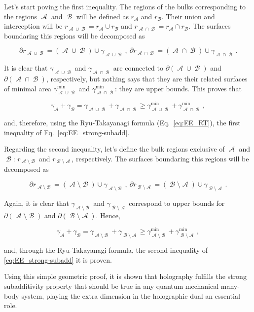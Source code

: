 \documentclass[twocolumn]{revtex4}
\providecommand{\eq}[2]{
    \begin{equation}
        #2
    \label{eq:#1}
    \end{equation}
}
\DeclareMathOperator{\calA}{\mathcal{A}}
\DeclareMathOperator{\calB}{\mathcal{B}}
\begin{document}
Let's start poving the first inequality. The regions of the bulks corresponding to the regions $\calA$ and $\calB$ will be defined as $r_{\calA}$ and $r_{\calB}$. Their union and interception will be $r_{\calA \cup \calB} = r_{\calA} \cup r_{\calB}$ and $r_{\calA \cap \calB} = r_{\calA} \cap r_{\calB}$. The surfaces boundaring this regions will be decomposed as
\eq{SS_dr-1}{
    \partial r_{\calA \cup \calB} = (\calA \cup \calB) \cup \gamma_{\calA \cup \calB} \ , \ \partial r_{\calA \cap \calB } = (\calA \cap \calB) \cup \gamma_{\calA \cap \calB} \ .
}
It is clear that $\gamma_{\calA \cup \calB}$ and $\gamma_{\calA \cap \calB}$ are connected to $\partial (\calA \cup \calB)$ and $\partial (\calA \cap \calB)$, respectively, but nothing says that they are their related surfaces of minimal area $\gamma^{\text{min}}_{\calA \cup \calB}$ and $\gamma^{\text{min}}_{\calA \cap \calB}$: they are upper bounds. This proves that
\eq{SS_gamma-1}{
    \gamma_{\calA} + \gamma_{\calB} = \gamma_{\calA \cup \calB} + \gamma_{\calA \cap \calB} \ge \gamma^{\text{min}}_{\calA \cup \calB} + \gamma^{\text{min}}_{\calA \cap \calB} \ ,
}
and, therefore, using the Ryu-Takayanagi formula (Eq.~\ref{eq:EE_RT}), the first inequality of Eq.~\ref{eq:EE_strong-subadd}.

Regarding the second inequality, let's define the bulk regions exclusive of $\calA$ and $\calB$: $r_{\calA \setminus \calB}$ and $r_{\calB \setminus \calA}$, respectively. The surfaces boundaring this regions will be decomposed as
\eq{SS_dr-2}{
    \partial r_{\calA \setminus \calB} = (\calA \setminus \calB) \cup \gamma_{\calA \setminus \calB} \ , \ \partial r_{\calB \setminus \calA } = (\calB \setminus \calA) \cup \gamma_{\calB \setminus \calA} \ .
}
Again, it is clear that $\gamma_{\calA \setminus \calB}$ and $\gamma_{\calB \setminus \calA}$ correspond to upper bounds for $\partial (\calA \setminus \calB)$ and $\partial (\calB \setminus \calA)$. Hence,
\eq{SS_gamma-2}{
    \gamma_{\calA} + \gamma_{\calB} = \gamma_{\calA \setminus \calB} + \gamma_{\calB \setminus \calA} \ge \gamma^{\text{min}}_{\calA \setminus \calB} + \gamma^{\text{min}}_{\calB \setminus \calA} \ ,
}
and, through the Ryu-Takayanagi formula, the second inequality of \ref{eq:EE_strong-subadd} it is proven.

Using this simple geometric proof, it is shown that holography fulfills the strong subadditivity property that should be true in any quantum mechanical many-body system, playing the extra dimension in the holographic dual an essential role.
\end{document}
